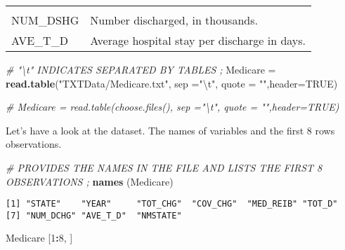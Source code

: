 \documentclass[]{book}
\newenvironment{Shaded}{\begin{snugshade}}{\end{snugshade}}
\newcommand{\CharTok}[1]{\textcolor[rgb]{0.31,0.60,0.02}{#1}}
\newcommand{\CommentTok}[1]{\textcolor[rgb]{0.56,0.35,0.01}{\textit{#1}}}
\newcommand{\DataTypeTok}[1]{\textcolor[rgb]{0.13,0.29,0.53}{#1}}
\newcommand{\DecValTok}[1]{\textcolor[rgb]{0.00,0.00,0.81}{#1}}
\newcommand{\KeywordTok}[1]{\textcolor[rgb]{0.13,0.29,0.53}{\textbf{#1}}}
\newcommand{\NormalTok}[1]{#1}
\newcommand{\OperatorTok}[1]{\textcolor[rgb]{0.81,0.36,0.00}{\textbf{#1}}}
\newcommand{\OtherTok}[1]{\textcolor[rgb]{0.56,0.35,0.01}{#1}}
\newcommand{\StringTok}[1]{\textcolor[rgb]{0.31,0.60,0.02}{#1}}
\begin{document}
\begin{longtable}[]{@{}ll@{}}
\begin{minipage}[t]{0.85\columnwidth}
\end{minipage}\tabularnewline
\begin{minipage}[t]{0.09\columnwidth}\raggedright
NUM\_DSHG\strut
\end{minipage} & \begin{minipage}[t]{0.85\columnwidth}\raggedright
Number discharged, in thousands.\strut
\end{minipage}\tabularnewline
\begin{minipage}[t]{0.09\columnwidth}\raggedright
AVE\_T\_D\strut
\end{minipage} & \begin{minipage}[t]{0.85\columnwidth}\raggedright
Average hospital stay per discharge in days.\strut
\end{minipage}\tabularnewline
\bottomrule
\end{longtable}

\begin{Shaded}
\begin{Highlighting}[]
\CommentTok{#  "\textbackslash{}t"  INDICATES SEPARATED BY TABLES  ;}
\NormalTok{Medicare  =}\StringTok{ }\KeywordTok{read.table}\NormalTok{(}\StringTok{"TXTData/Medicare.txt"}\NormalTok{, }\DataTypeTok{sep =}\StringTok{"}\CharTok{\textbackslash{}t}\StringTok{"}\NormalTok{, }\DataTypeTok{quote =} \StringTok{""}\NormalTok{,}\DataTypeTok{header=}\OtherTok{TRUE}\NormalTok{)}

\CommentTok{# Medicare = read.table(choose.files(), sep ="\textbackslash{}t", quote = "",header=TRUE)}
\end{Highlighting}
\end{Shaded}

Let's have a look at the dataset. The names of variables and the first 8 rows observations.

\begin{Shaded}
\begin{Highlighting}[]
\CommentTok{#  PROVIDES THE NAMES IN THE FILE AND LISTS THE FIRST 8 OBSERVATIONS  ;}
\KeywordTok{names}\NormalTok{ (Medicare)}
\end{Highlighting}
\end{Shaded}

\begin{verbatim}
[1] "STATE"    "YEAR"     "TOT_CHG"  "COV_CHG"  "MED_REIB" "TOT_D"   
[7] "NUM_DCHG" "AVE_T_D"  "NMSTATE" 
\end{verbatim}

\begin{Shaded}
\begin{Highlighting}[]
\NormalTok{Medicare [}\DecValTok{1}\OperatorTok{:}\DecValTok{8}\NormalTok{, ]}
\end{Highlighting}
\end{Shaded}
\end{document}
